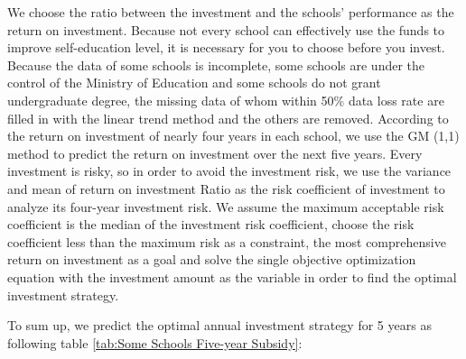 \documentclass{mcmthesis}
\begin{document}
\par We choose the ratio between the investment and the schools’ performance as the return on investment. Because not every school can effectively use the funds to improve self-education level, it is necessary for you to choose before you invest. Because the data of some schools is incomplete, some schools are under the control of the Ministry of Education and some schools do not grant undergraduate degree, the missing data of whom within 50\% data loss rate are filled in with the linear trend method and the others are removed. According to the return on investment of nearly four years in each school, we use the GM (1,1) method to predict the return on investment over the next five years. Every investment is risky, so in order to avoid the investment risk, we use the variance and mean of return on investment Ratio as the risk coefficient of investment to analyze its four-year investment risk. We assume the maximum acceptable risk coefficient is the median of the investment risk coefficient, choose the risk coefficient less than the maximum risk as a constraint, the most comprehensive return on investment  as a goal and solve the single objective optimization equation with the investment amount as the variable in order to find the optimal investment strategy.  
\par To sum up, we predict the optimal annual investment strategy for 5 years as following table \ref{tab:Some Schools Five-year Subsidy}:
\end{document}
